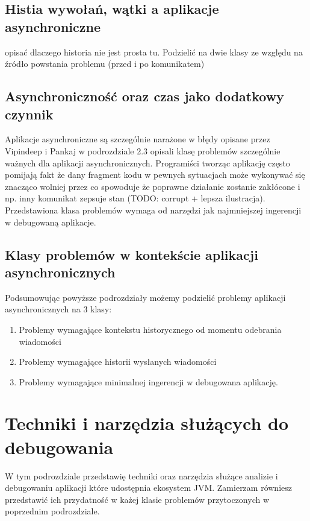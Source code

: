 \subsection{Histia wywołań, wątki a aplikacje asynchroniczne}

opisać dlaczego historia nie jest prosta tu. Podzielić na dwie klasy ze względu na źródło powstania problemu (przed i po komunikatem)

\subsection{Asynchroniczność oraz czas jako dodatkowy czynnik}

Aplikacje asynchroniczne są szczególnie narażone w błędy opisane przez Vipindeep i Pankaj w podrozdziale 2.3 \cite{commonBugs} opisali klasę problemów szczególnie ważnych dla aplikacji asynchronicznych. Programiści tworząc aplikację  często pomijają fakt że dany fragment kodu w pewnych sytuacjach może wykonywać się znacząco wolniej przez co spowoduje że poprawne działanie zostanie zakłócone i np. inny komunikat zepsuje stan (TODO: corrupt + lepsza ilustracja). Przedstawiona klasa problemów wymaga od narzędzi jak najmniejszej ingerencji w debugowaną aplikacje. 

\subsection{Klasy problemów w kontekście aplikacji asynchronicznych}

Podsumowując powyższe podrozdziały możemy podzielić problemy aplikacji asynchronicznych na 3 klasy:
\begin{enumerate}
\item Problemy wymagające kontekstu historycznego od momentu odebrania wiadomości
\item Problemy wymagające historii wysłanych wiadomości
\item Problemy wymagające minimalnej ingerencji w debugowana aplikację. 
\end{enumerate} 

\section{Techniki i narzędzia służących do debugowania}

W tym podrozdziale przedstawię techniki oraz narzędzia służące analizie i debugowaniu aplikacji które udostępnia ekosystem JVM. Zamierzam równiesz przedstawić ich przydatność w każej klasie problemów przytoczonych w poprzednim podrozdziale.

